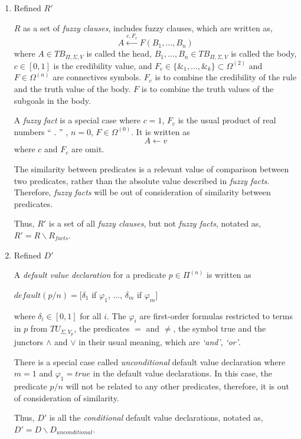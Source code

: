 \begin{enumerate}
 \item Refined $R'$

    $R$ as a set of \textit{fuzzy clauses}, includes fuzzy clauses, which are written as, \[A \stackrel{c,F_c}{\longleftarrow}F(B_1,...,B_n)\]
    where $A \in TB_{\Pi,\Sigma,V}$ is called the head, $B_1,...,B_n \in TB_{\Pi,\Sigma,V}$ is called the body, $c\in[0,1]$ is the credibility value, and $F_c\in\{\&_1,...,\&_k\}\subset\Omega^{(2)}$ and $F\in\Omega^{(n)}$ are connectives symbols. $F_c$ is to combine the credibility of the rule and the truth value of the body. $F$ is to combine the truth values of the subgoals in the body.
   
    A \textit{fuzzy fact} is a special case where $c=1$, $F_c$ is the usual product of real numbers  `` . ''  , $n=0$, $F\in\Omega^{(0)}$. It is written as \[A \longleftarrow v\]
    where $c$ and $F_c$ are omit. 

    The similarity between predicates is a relevant value of comparison between two predicates, rather than the absolute value described in \textit{fuzzy facts}. Therefore, \textit{fuzzy facts} will be out of consideration of similarity between predicates.
    
    Thus, $R'$ is a set of all \textit{fuzzy clauses}, but not \textit{fuzzy facts}, notated as, $R'=R\backslash R_{facts}$.
 \item Refined $D'$

    A \textit{default value declaration} for a predicate $p \in \Pi ^{(n)}$ is written as 
    \begin{center}
       $default(p/n)=[\delta_1$ if $\varphi_1$, ..., $\delta_m$ if $\varphi_m]$
    \end{center}
    where $\delta_i\in[0,1]$ for all $i$. The $\varphi_i$ are first-order formulas restricted to terms in $p$ from $TU_{\Sigma,V_p}$, the predicates $=$ and $\neq$, the symbol true and the junctors $\wedge$ and $\vee$ in their usual meaning, which are \textit{`and'}, \textit{ `or'}.

    There is a special case called \textit{unconditional} default value declaration where $m=1$ and $\varphi_1=true$ in the default value declarations. In this case, the predicate $p/n$ will not be related to any other predicates, therefore, it is out of consideration of similarity.

    Thus, $D'$ is all the \textit{conditional} default value declarations, notated as, $D'=D\backslash D_{unconditional}$.


\end{enumerate}
